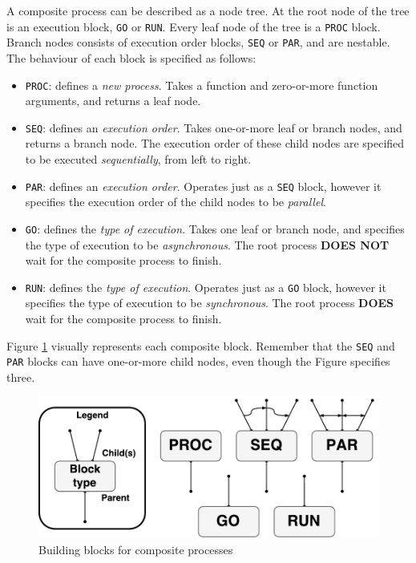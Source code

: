 A composite process can be described as a node tree. At the root node of the tree is an execution block, \texttt{GO} or \texttt{RUN}. Every leaf node of the tree is a \texttt{PROC} block. Branch nodes consists of execution order blocks, \texttt{SEQ} or \texttt{PAR}, and are nestable. The behaviour of each block is specified as follows:
\begin{itemize}[topsep=0em,itemsep=-1em,partopsep=-1em,parsep=1em]
    \item \texttt{PROC}: defines a \textit{new process}. Takes a function and zero\hyp{}or\hyp{}more function arguments, and returns a leaf node. 
    
    \item \texttt{SEQ}: defines an \textit{execution order}. Takes one\hyp{}or\hyp{}more leaf or branch nodes, and returns a branch node. The execution order of these child nodes are specified to be executed \textit{sequentially}, from left to right. 
    
    \item \texttt{PAR}: defines an \textit{execution order}. Operates just as a \texttt{SEQ} block, however it specifies the execution order of the child nodes to be \textit{parallel}. 
    
    \item \texttt{GO}: defines the \textit{type of execution}. Takes one leaf or branch node, and specifies the type of execution to be \textit{asynchronous}. The root process \textbf{DOES NOT} wait for the composite process to finish.
    
    \item \texttt{RUN}: defines the \textit{type of execution}. Operates just as a \texttt{GO} block, however it specifies the type of execution to be \textit{synchronous}. The root process \textbf{DOES} wait for the composite process to finish.
\end{itemize}

Figure \ref{fig:composite_blocks} visually represents each composite block. Remember that the \texttt{SEQ} and \texttt{PAR} blocks can have one\hyp{}or\hyp{}more child nodes, even though the Figure specifies three. 

\FloatBarrier

\begin{figure}[h]
    \centering
    \includegraphics[width=0.8\linewidth]{fig/csp}
    \caption{Building blocks for composite processes}
    \label{fig:composite_blocks}
\end{figure}

